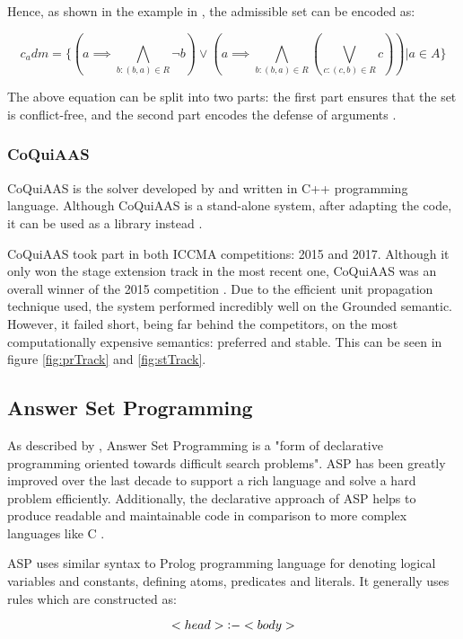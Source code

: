 Hence, as shown in the example in \citet{solvingMethods}, the admissible set can be encoded as:

\begin{equation}
c_adm = \{(a \implies \bigwedge\limits_{ b : (b,a) \in R } \neg  b) \lor (a \implies \bigwedge\limits_{b:(b,a) \in R} (\bigvee\limits_{c:(c,b) \in R} c) ) | a \in A\}
\end{equation}

The above equation can be split into two parts: the first part ensures that the set is conflict-free, and the second part encodes the defense of arguments \citep{csp2}. 

\subsubsection{CoQuiAAS}
CoQuiAAS is the solver developed by \citet{coquiaas} and written in C++ programming language. Although CoQuiAAS is a stand-alone system, after adapting the code, it can be used as a library instead \citep{coquiaas}.

CoQuiAAS took part in both ICCMA competitions: 2015 and 2017. Although it only won the stage extension track in the most recent one, CoQuiAAS was an overall winner of the 2015 competition \citep{iccma2015}. Due to the efficient unit propagation technique used, the system performed incredibly well on the Grounded semantic. However, it failed short, being far behind the competitors, on the most computationally expensive semantics: preferred and stable. This can be seen in figure \ref{fig:prTrack} and \ref{fig:stTrack}.

\subsection{Answer Set Programming}
As described by \citet{asp}, Answer Set Programming is a "form of declarative programming oriented towards difficult search problems". ASP has been greatly improved over the last decade to support a rich language and solve a hard problem efficiently. Additionally, the declarative approach of ASP helps to produce readable and maintainable code in comparison to more complex languages like C \citep{solvingMethods}.

ASP uses similar syntax to Prolog programming language for denoting logical variables and constants, defining atoms, predicates and literals. It generally uses rules which are constructed as:

\begin{equation}
	<head> \mathop{\vcenter{\hbox{$:$}}-}  <body>
\end{equation}

